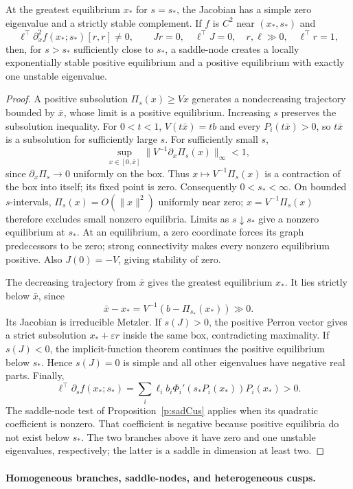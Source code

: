 At the greatest equilibrium $x_*$ for $s=s_*$, the Jacobian has a
simple zero eigenvalue and a strictly stable complement. If $f$ is
$C^2$ near $(x_*,s_*)$ and
\[
 \ell^\top\partial_x^2f(x_*;s_*)[r,r]\ne0,
 \qquad Jr=0,\quad\ell^\top J=0,\quad r,\ell\gg0,
 \quad\ell^\top r=1,
\]
then, for $s>s_*$ sufficiently close to $s_*$, a saddle-node creates
a locally exponentially stable positive equilibrium and a positive
equilibrium with exactly one unstable eigenvalue.
\eeT
\begin{proof}
A positive subsolution $\Pi_s(x)\ge Vx$ generates a nondecreasing
trajectory bounded by $\bar x$, whose limit is a positive equilibrium.
Increasing $s$ preserves the subsolution inequality. For $0<t<1$,
$V(t\bar x)=tb$ and every $P_i(t\bar x)>0$, so $t\bar x$ is a
subsolution for sufficiently large $s$. For sufficiently small $s$,
\[
 \sup_{x\in[0,\bar x]}\|V^{-1}\partial_x\Pi_s(x)\|_\infty<1,
\]
since $\partial_x\Pi_s\to0$ uniformly on the box. Thus
$x\mapsto V^{-1}\Pi_s(x)$ is a contraction of the box into itself;
its fixed point is zero. Consequently $0<s_*<\infty$.
On bounded $s$-intervals, $\Pi_s(x)=O(\|x\|^2)$ uniformly near zero;
$x=V^{-1}\Pi_s(x)$ therefore excludes small nonzero equilibria.
Limits as $s\downarrow s_*$ give a nonzero equilibrium at $s_*$.
At an equilibrium, a zero coordinate forces its graph predecessors to
be zero; strong connectivity makes every nonzero equilibrium positive.
Also $J(0)=-V$, giving stability of zero.

The decreasing trajectory from $\bar x$ gives the greatest equilibrium
$x_*$. It lies strictly below $\bar x$, since
\[
 \bar x-x_*=V^{-1}(b-\Pi_{s_*}(x_*))\gg0.
\]
Its Jacobian is irreducible Metzler. If $s(J)>0$, the positive Perron
vector gives a strict subsolution $x_*+\varepsilon r$ inside the same
box, contradicting maximality. If $s(J)<0$, the implicit-function
theorem continues the positive equilibrium below $s_*$. Hence $s(J)=0$
is simple and all other eigenvalues have negative real parts.
Finally,
\[
 \ell^\top\partial_s f(x_*;s_*)
 =\sum_i\ell_i b_i\Phi_i'(s_*P_i(x_*))P_i(x_*)>0.
\]
The saddle-node test of Proposition~\ref{p:sadCus} applies when
its quadratic coefficient is nonzero.
That coefficient is negative because positive equilibria do not exist
below $s_*$. The two branches above it have zero and one unstable
eigenvalues, respectively; the latter is a saddle in dimension at least two.
\end{proof}

\paragraph{Homogeneous branches, saddle-nodes, and heterogeneous cusps.}

